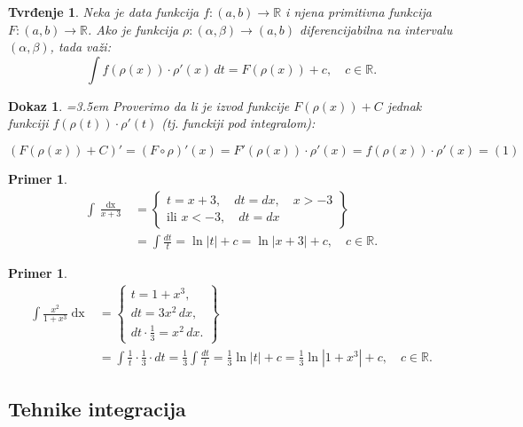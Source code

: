 \documentclass[11pt]{article}
\newcounter{mathitem}
\theoremstyle{plain}
\newtheorem{primer}[mathitem]{Primer}
\newtheorem{tvrdjenje}[mathitem]{Tvrđenje}
\theoremstyle{serbnodot}
\newtheorem*{dokaz}{Dokaz}
\DeclareMathOperator{\dx}{dx}
\begin{document}
\begin{tvrdjenje}
  Neka je data funkcija $ f:(a,b) \to \mathbb{R} $  i njena primitivna funkcija $ F:(a,b) \to \mathbb{R} $. Ako je funkcija $ \rho:(\alpha, \beta) \to (a,b) $ diferencijabilna na intervalu $ (\alpha, \beta) $, tada važi:
  \[
    \int f(\rho(x)) \cdot \rho'(x) \, dt = F(\rho(x)) + c, \quad c \in \mathbb{R}. \tag{1}
  \]
\end{tvrdjenje}
\begin{dokaz}
    \par\hangindent=3.5em
    Proverimo da li je izvod funkcije $ F(\rho(x)) + C $ jednak funkciji $ f(\rho(t)) \cdot \rho'(t) $ (tj. funckiji pod integralom):
  
    \[ \left( F(\rho(x)) + C \right)' = (F\circ\rho)'(x) = F'(\rho(x)) \cdot \rho'(x) = f(\rho(x)) \cdot \rho'(x) = (1)\]
  
  
\end{dokaz}

\begin{primer}
  \begin{align*}
    \int \frac{\dx}{x+3} &= \left\{ \begin{array}{l}
      t = x + 3, \quad dt = dx, \quad x > -3 \\
      \text{ili } x < -3, \quad dt = dx
      \end{array}
      \right\} \\
    &= \int \frac{dt}{t} = \ln|t| + c = \ln|x+3| + c, \quad c \in \mathbb{R}.
  \end{align*}
\end{primer}

\begin{primer}
  \begin{align*}
    \int \frac{x^2}{1+x^3} \dx &= \left\{ \begin{array}{l}
      t = 1 + x^3, \\ dt = 3x^2 \, dx, \\
      dt \cdot \frac{1}{3} = x^2 \, dx.
      \end{array}
      \right\} \\
    &= \int \frac{1}{t} \cdot \frac{1}{3} \cdot dt = \frac{1}{3} \int \frac{dt}{t} = \frac{1}{3} \ln|t| + c = \frac{1}{3} \ln|1+x^3| + c, \quad c \in \mathbb{R}.
  \end{align*}
\end{primer}

\newpage

\subsection{Tehnike integracija}
\end{document}

